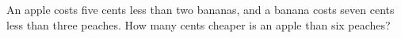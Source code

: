 An apple costs five cents less than two bananas, and a banana costs seven cents less than three peaches. How many cents cheaper is an apple than six peaches?
